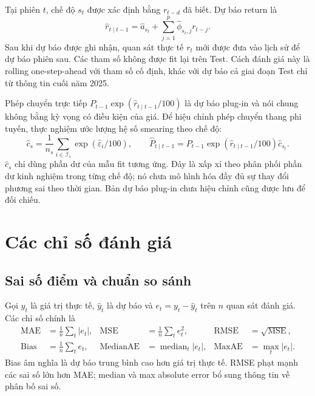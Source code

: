 \documentclass[a4paper,reqno,oneside]{book}
\numberwithin{equation}{chapter}
\begin{document}
Tại phiên $t$, chế độ $s_t$ được xác định bằng $r_{t-d}$ đã biết. Dự báo return là
\begin{equation}
 \widehat r_{t\mid t-1}
 =\widehat a_{s_t}+\sum_{j=1}^{p}\widehat\phi_{s_t,j}r_{t-j}.
 \label{eq:setar-forecast}
\end{equation}
Sau khi dự báo được ghi nhận, quan sát thực tế $r_t$ mới được đưa vào lịch sử để dự báo phiên sau. Các tham số không được fit lại trên Test. Cách đánh giá này là rolling one-step-ahead với tham số cố định, khác với dự báo cả giai đoạn Test chỉ từ thông tin cuối năm 2025.

Phép chuyển trực tiếp $P_{t-1}\exp(\widehat r_{t\mid t-1}/100)$ là dự báo plug-in và nói chung không bằng kỳ vọng có điều kiện của giá. Để hiệu chỉnh phép chuyển thang phi tuyến, thực nghiệm ước lượng hệ số smearing theo chế độ:
\begin{equation}
 \widehat c_s=\frac{1}{n_s}\sum_{i\in\mathcal I_s}
                  \exp(\widehat\varepsilon_i/100),
 \qquad
 \widehat P_{t\mid t-1}
 =P_{t-1}\exp(\widehat r_{t\mid t-1}/100)\widehat c_{s_t}.
 \label{eq:setar-price}
\end{equation}
$\widehat c_s$ chỉ dùng phần dư của mẫu fit tương ứng. Đây là xấp xỉ theo phân phối phần dư kinh nghiệm trong từng chế độ; nó chưa mô hình hóa đầy đủ sự thay đổi phương sai theo thời gian. Bản dự báo plug-in chưa hiệu chỉnh cũng được lưu để đối chiếu.

\section{Các chỉ số đánh giá}

\subsection{Sai số điểm và chuẩn so sánh}

Gọi $y_t$ là giá trị thực tế, $\widehat y_t$ là dự báo và $e_t=y_t-\widehat y_t$ trên $n$ quan sát đánh giá. Các chỉ số chính là
\begin{align}
 \mathrm{MAE}&=\frac1n\sum_t|e_t|,&
 \mathrm{MSE}&=\frac1n\sum_t e_t^2,&
 \mathrm{RMSE}&=\sqrt{\mathrm{MSE}},\label{eq:setar-errors}\\
 \mathrm{Bias}&=\frac1n\sum_t e_t,&
 \mathrm{MedianAE}&=\operatorname{median}_t|e_t|,&
 \mathrm{MaxAE}&=\max_t|e_t|.\nonumber
\end{align}
Bias âm nghĩa là dự báo trung bình cao hơn giá trị thực tế. RMSE phạt mạnh các sai số lớn hơn MAE; median và max absolute error bổ sung thông tin về phân bố sai số.
\end{document}
